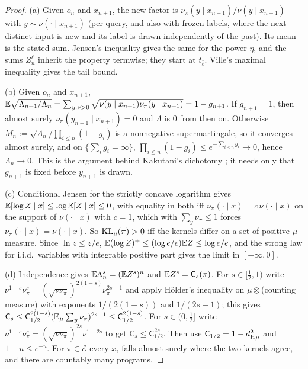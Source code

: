 \begin{proof}
(a) Given $o_n$ and $x_{n+1}$, the new factor is $\nu_\pi(y\mid x_{n+1})/\nu(y\mid x_{n+1})$ with $y\sim\nu(\cdot\mid x_{n+1})$ (per query, and also with frozen labels, where the next distinct input is new and its label is drawn independently of the past). Its mean is the stated sum. Jensen's inequality gives the same for the power $\eta$, and the sums $Z^{\bar\ell}_n$ inherit the property termwise; they start at $t_{\bar\ell}$. Ville's maximal inequality \citep{ville1939etude} gives the tail bound.

(b) Given $o_n$ and $x_{n+1}$, $\mathbb{E}\sqrt{\Lambda_{n+1}/\Lambda_n}=\sum_{y:\nu>0}\sqrt{\nu(y\mid x_{n+1})\nu_\pi(y\mid x_{n+1})}=1-g_{n+1}$. If $g_{n+1}=1$, then almost surely $\nu_\pi(y_{n+1}\mid x_{n+1})=0$ and $\Lambda$ is $0$ from then on. Otherwise $M_n:=\sqrt{\Lambda_n}/\prod_{i\le n}(1-g_i)$ is a nonnegative supermartingale, so it converges almost surely, and on $\{\sum_ig_i=\infty\}$, $\prod_{i\le n}(1-g_i)\le e^{-\sum_{i\le n}g_i}\to0$, hence $\Lambda_n\to0$. This is the argument behind Kakutani's dichotomy \citep{kakutani1948equivalence}; it needs only that $g_{n+1}$ is fixed before $y_{n+1}$ is drawn.

(c) Conditional Jensen for the strictly concave logarithm gives $\mathbb{E}[\log Z\mid x]\le\log\mathbb{E}[Z\mid x]\le0$, with equality in both iff $\nu_\pi(\cdot\mid x)=c\,\nu(\cdot\mid x)$ on the support of $\nu(\cdot\mid x)$ with $c=1$, which with $\sum_y\nu_\pi\le1$ forces $\nu_\pi(\cdot\mid x)=\nu(\cdot\mid x)$. So $\operatorname{KL}_\mu(\pi)>0$ iff the kernels differ on a set of positive $\mu$-measure. Since $\ln z\le z/e$, $\mathbb{E}(\log Z)^+\le(\log e/e)\mathbb{E} Z\le\log e/e$, and the strong law for i.i.d.\ variables with integrable positive part gives the limit in $[-\infty,0]$.

(d) Independence gives $\mathbb{E}\Lambda_n^s=(\mathbb{E} Z^s)^n$ and $\mathbb{E} Z^s=\mathsf C_s(\pi)$. For $s\in[\frac12,1)$ write $\nu^{1-s}\nu_\pi^s=(\sqrt{\nu\nu_\pi})^{2(1-s)}\nu_\pi^{2s-1}$ and apply Hölder's inequality on $\mu\otimes$(counting measure) with exponents $1/(2(1-s))$ and $1/(2s-1)$; this gives $\mathsf C_s\le\mathsf C_{1/2}^{2(1-s)}(\mathbb{E}_\mu\sum_y\nu_\pi)^{2s-1}\le\mathsf C_{1/2}^{2(1-s)}$. For $s\in(0,\frac12]$ write $\nu^{1-s}\nu_\pi^s=(\sqrt{\nu\nu_\pi})^{2s}\nu^{1-2s}$ to get $\mathsf C_s\le\mathsf C_{1/2}^{2s}$. Then use $\mathsf C_{1/2}=1-{d_{\mathrm{H}}^{2}}_\mu$ and $1-u\le e^{-u}$. For $\pi\in\mathcal E$ every $x_i$ falls almost surely where the two kernels agree, and there are countably many programs.
\end{proof}

